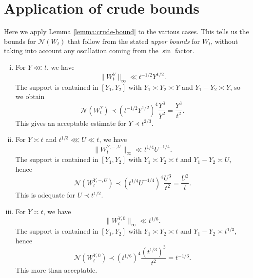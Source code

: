 \documentclass[reqno]{amsart} 
\begin{document}
\section{Application of crude bounds}\label{sec:appl-crude-bounds}
Here we apply Lemma \ref{lemma:crude-bound} to the various cases.  This tells us the bounds for $\mathcal{N}(W_t)$ that follow from the stated \emph{upper bounds} for $W_t$, without taking into account any oscillation coming from the $\sin$ factor.
\begin{enumerate}[(i)]
\item For $Y \lll t$, we have
  \begin{equation*}
    \lVert W_t^{Y} \rVert_{\infty} \ll t ^{- 1/2} Y ^{1/2}.
  \end{equation*}
  The support is contained in $[Y_1,Y_2]$ with $Y_1 \asymp Y_2 \asymp Y$ and $Y_1 - Y_2 \asymp Y$, so we obtain
  \begin{equation}\label{eqn:crude-bound-W-t-Y}
    \mathcal{N} (W _t ^Y ) \prec (t ^{- 1/2} Y ^{1/2} )^4 \frac{Y^3}{Y^2} = \frac{Y ^3 }{t^2}.    
  \end{equation}
  This gives an acceptable estimate for $Y \prec t ^{2/3}$.
\item \label{itm:ref-haseo-l4:1} For $Y \asymp t$ and $t ^{1/3} \lll U \ll t$, we have
  \begin{equation*}
    \lVert W _t ^{Y, -, U} \rVert_{\infty} \ll t ^{1/4} U ^{-1/4}.
  \end{equation*}
  The support is contained in $[Y_1,Y_2]$ with $Y_1 \asymp Y_2 \asymp t$ and $Y_1 - Y_2 \asymp U$, hence
  \begin{equation}\label{eqn:crude-W-t-Y-minus-U}
    \mathcal{N} (W _t ^{Y, -, U}) \prec (t ^{1/4}  U  ^{- 1/4})^4 \frac{U ^3 }{t ^2}
    =
    \frac{U^2}{t}.
  \end{equation}
  This is adequate for $U \prec t ^{1/2} $.
\item For $Y \asymp t$, we have
  \begin{equation*}
    \lVert W_t^{Y,0} \rVert _{\infty} \ll t ^{1/6}.
  \end{equation*}
  The support is contained in $[Y_1,Y_2]$ with $Y _1 \asymp Y _2 \asymp t$ and $Y _1 - Y _2 \asymp t ^{1/3}$, hence
  \begin{equation*}
    \mathcal{N} (W _t ^{Y, 0}) \prec (t ^{1/6}) ^4 \frac{(t ^{1/3} ) ^3 }{t ^2 }
    = t ^{- 1/3}.    
  \end{equation*}
  This more than acceptable.


\end{enumerate}
\end{document}
